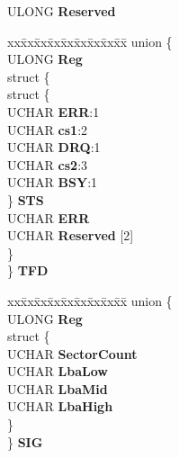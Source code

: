 \begin{DoxyCompactItemize}
\begin{tabbing}
\end{tabbing}\item 
\mbox{\label{struct___i_d_e___a_h_c_i___p_o_r_t___r_e_g_i_s_t_e_r_s_af30b33f90350fd3e92b55d3dc807b5c3}} 
U\+L\+O\+NG {\bfseries Reserved}
\item 
\mbox{\label{struct___i_d_e___a_h_c_i___p_o_r_t___r_e_g_i_s_t_e_r_s_a95f4a601dc89c5cf5e5783cf70d3f545}} 
\begin{tabbing}
xx\=xx\=xx\=xx\=xx\=xx\=xx\=xx\=xx\=\kill
union \{\\
\>ULONG {\bfseries Reg}\\
\mbox{\label{union___i_d_e___a_h_c_i___p_o_r_t___r_e_g_i_s_t_e_r_s_1_1_0D1019_ab44f30e52ca04fa4a4ac062a447a91fb}} 
\>struct \{\\
\>\>struct \{\\
\>\>\>UCHAR {\bfseries ERR}:1\\
\>\>\>UCHAR {\bfseries cs1}:2\\
\>\>\>UCHAR {\bfseries DRQ}:1\\
\>\>\>UCHAR {\bfseries cs2}:3\\
\>\>\>UCHAR {\bfseries BSY}:1\\
\>\>\} {\bfseries STS}\\
\>\>UCHAR {\bfseries ERR}\\
\>\>UCHAR {\bfseries Reserved} \mbox{[}2\mbox{]}\\
\>\} \\
\} {\bfseries TFD}\\

\end{tabbing}\item 
\mbox{\label{struct___i_d_e___a_h_c_i___p_o_r_t___r_e_g_i_s_t_e_r_s_a6edfe3057c3bdc3aebf6912adee5bcc3}} 
\begin{tabbing}
xx\=xx\=xx\=xx\=xx\=xx\=xx\=xx\=xx\=\kill
union \{\\
\>ULONG {\bfseries Reg}\\
\mbox{\label{union___i_d_e___a_h_c_i___p_o_r_t___r_e_g_i_s_t_e_r_s_1_1_0D1020_ad22d1e833f1c3410209880a2dc37bbad}} 
\>struct \{\\
\>\>UCHAR {\bfseries SectorCount}\\
\>\>UCHAR {\bfseries LbaLow}\\
\>\>UCHAR {\bfseries LbaMid}\\
\>\>UCHAR {\bfseries LbaHigh}\\
\>\} \\
\} {\bfseries SIG}\\


\end{tabbing}
\end{DoxyCompactItemize}
